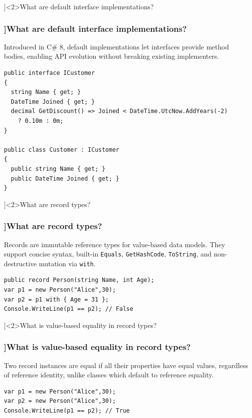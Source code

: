 \QuestionSlide[\CategoryBadge[LangColor!20]{Language Feature}]<2>{What are default interface implementations?}
\begin{frame}[fragile]
  \frametitle{\AnswerTitle[\CategoryBadge[LangColor!20]{Language Feature}]{What are default interface implementations?}}

  {\footnotesize
    Introduced in C\# 8, default implementations let interfaces provide method bodies, enabling API evolution without breaking existing implementers.
  }

  \begin{verbatim}
public interface ICustomer
{
  string Name { get; }
  DateTime Joined { get; }
  decimal GetDiscount() => Joined < DateTime.UtcNow.AddYears(-2)
    ? 0.10m : 0m;
}

public class Customer : ICustomer
{
  public string Name { get; }
  public DateTime Joined { get; }
}
  \end{verbatim}
\end{frame}

\QuestionSlide[\CategoryBadge[LangColor!20]{Language Feature}]<2>{What are record types?}
\begin{frame}[fragile]
  \frametitle{\AnswerTitle[\CategoryBadge[LangColor!20]{Language Feature}]{What are record types?}}

  {\footnotesize
    Records are immutable reference types for value-based data models. They support concise syntax, built-in \texttt{Equals}, \texttt{GetHashCode}, \texttt{ToString}, and non-destructive mutation via \texttt{with}.
  }

  \begin{verbatim}
public record Person(string Name, int Age);
var p1 = new Person("Alice",30);
var p2 = p1 with { Age = 31 };
Console.WriteLine(p1 == p2); // False
  \end{verbatim}
\end{frame}

\QuestionSlide[\CategoryBadge[LangColor!20]{Language Feature}]<2>{What is value-based equality in record types?}
\begin{frame}[fragile]
  \frametitle{\AnswerTitle[\CategoryBadge[LangColor!20]{Language Feature}]{What is value-based equality in record types?}}

  {\footnotesize
    Two record instances are equal if all their properties have equal values, regardless of reference identity, unlike classes which default to reference equality.
  }

  \begin{verbatim}
var p1 = new Person("Alice",30);
var p2 = new Person("Alice",30);
Console.WriteLine(p1 == p2); // True
  \end{verbatim}
\end{frame}

